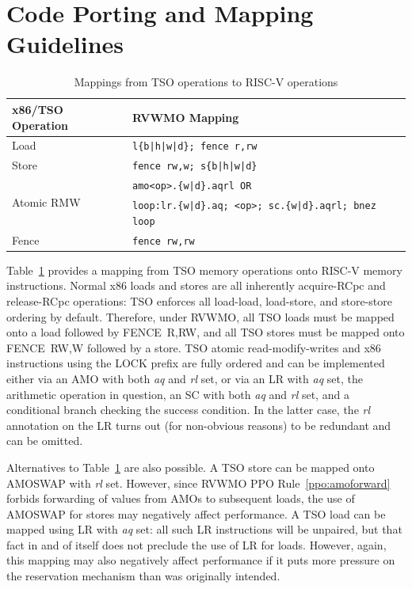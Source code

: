 \section{Code Porting and Mapping Guidelines}
\label{sec:memory:porting}

\begin{table}[h!]
  \centering
  \begin{tabular}{|l|l|}
    \hline
    x86/TSO Operation & RVWMO Mapping \\
    \hline
    \hline
    Load              & \tt l\{b|h|w|d\}; fence r,rw               \\
    \hline
    Store             & \tt fence rw,w; s\{b|h|w|d\}               \\
    \hline
    \multirow{2}{*}{Atomic RMW}
    & \tt amo<op>.\{w|d\}.aqrl \textrm{OR} \\
    & \tt loop:\@ lr.\{w|d\}.aq; <op>; sc.\{w|d\}.aqrl; bnez loop \\
    \hline
    Fence             & \tt fence rw,rw \\
    \hline
  \end{tabular}
  \caption{Mappings from TSO operations to RISC-V operations}
  \label{tab:tsomappings}
\end{table}

Table~\ref{tab:tsomappings} provides a mapping from TSO memory operations onto RISC-V memory instructions.
Normal x86 loads and stores are all inherently acquire-RCpc and release-RCpc operations: TSO enforces all load-load, load-store, and store-store ordering by default.
Therefore, under RVWMO, all TSO loads must be mapped onto a load followed by FENCE~R,RW, and all TSO stores must be mapped onto FENCE~RW,W followed by a store.
TSO atomic read-modify-writes and x86 instructions using the LOCK prefix are fully ordered and can be implemented either via an AMO with both {\em aq} and {\em rl} set, or via an LR with {\em aq} set, the arithmetic operation in question, an SC with both {\em aq} and {\em rl} set, and a conditional branch checking the success condition.
In the latter case, the {\em rl} annotation on the LR turns out (for non-obvious reasons) to be redundant and can be omitted.

Alternatives to Table~\ref{tab:tsomappings} are also possible.
A TSO store can be mapped onto AMOSWAP with {\em rl} set.
However, since RVWMO PPO Rule~\ref{ppo:amoforward} forbids forwarding of values from AMOs to subsequent loads, the use of AMOSWAP for stores may negatively affect performance.
A TSO load can be mapped using LR with {\em aq} set: all such LR instructions will be unpaired, but that fact in and of itself does not preclude the use of LR for loads.
However, again, this mapping may also negatively affect performance if it puts more pressure on the reservation mechanism than was originally intended.

